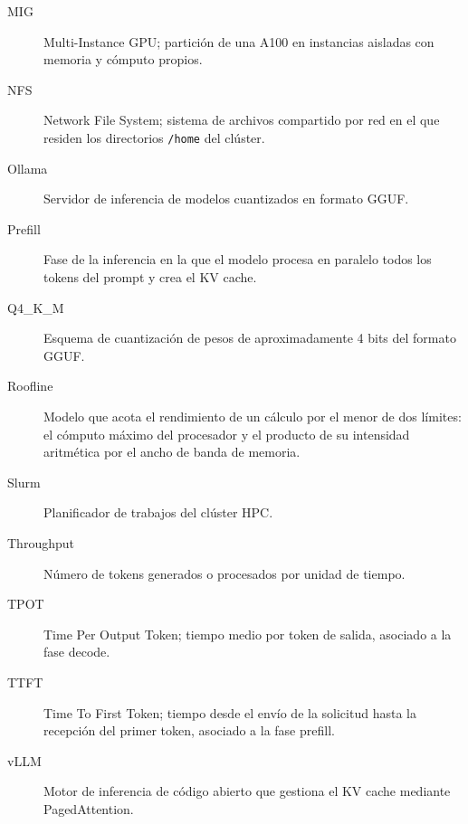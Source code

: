 \begin{description}
  \item[MIG] Multi-Instance GPU; partición de una A100 en instancias aisladas con memoria y cómputo propios.
  \item[NFS] Network File System; sistema de archivos compartido por red en el que residen los directorios \texttt{/home} del clúster.
  \item[Ollama] Servidor de inferencia de modelos cuantizados en formato GGUF.
  \item[Prefill] Fase de la inferencia en la que el modelo procesa en paralelo todos los tokens del prompt y crea el KV cache.
  \item[Q4\_K\_M] Esquema de cuantización de pesos de aproximadamente 4 bits del formato GGUF.
  \item[Roofline] Modelo que acota el rendimiento de un cálculo por el menor de dos límites: el cómputo máximo del procesador y el producto de su intensidad aritmética por el ancho de banda de memoria.
  \item[Slurm] Planificador de trabajos del clúster HPC.
  \item[Throughput] Número de tokens generados o procesados por unidad de tiempo.
  \item[TPOT] Time Per Output Token; tiempo medio por token de salida, asociado a la fase decode.
  \item[TTFT] Time To First Token; tiempo desde el envío de la solicitud hasta la recepción del primer token, asociado a la fase prefill.
  \item[vLLM] Motor de inferencia de código abierto que gestiona el KV cache mediante PagedAttention.
\end{description}
